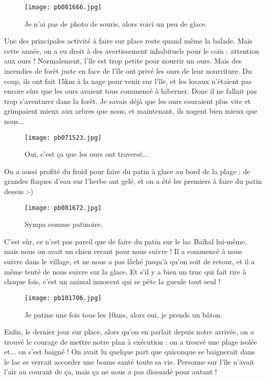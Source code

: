 \documentclass{book}
\begin{document}
\begin{figure}[h]
\centering
\texttt{[image: pb081666.jpg]}
\caption*{ Je n'ai pas de photo de souris, alors voici un peu de glace.}
\end{figure}

Une des principales activité à faire sur place reste quand même la balade. Mais cette année, on a eu droit à des avertissement inhabituels pour le coin : attention aux ours ! Normalement, l'île est trop petite pour nourrir un ours. Mais des incendies de forêt juste en face de l'île ont privé les ours de leur nourriture. Du coup, ils ont fait 15km à la nage pour venir sur l'île, et les locaux n'étaient pas encore sûrs que les ours avaient tous commencé à hiberner. Donc il ne fallait pas trop s'aventurer dans la forêt. Je savais déjà que les ours couraient plus vite et grimpaient mieux aux arbres que nous, et maintenant, ils nagent bien mieux que nous...


\begin{figure}[h]
\centering
\texttt{[image: pb071523.jpg]}
\caption*{ Oui, c'est ça que les ours ont traversé...}
\end{figure}

On a aussi profité du froid pour faire du patin à glace au bord de la plage : de grandes flaques d'eau sur l'herbe ont gelé, et on a été les premiers à faire du patin dessus :-)


\begin{figure}[h]
\centering
\texttt{[image: pb081672.jpg]}
\caption*{ Sympa comme patinoire.}
\end{figure}

C'est sûr, ce n'est pas pareil que de faire du patin sur le lac Baïkal lui-même, mais nous on avait un chien errant pour nous suivre ! Il a commencé à nous suivre dans le village, et ne nous a pas lâché jusqu'à qu'on soit de retour, et il a même tenté de nous suivre sur la glace. Et s'il y a bien un truc qui fait rire à chaque fois, c'est un animal innocent qui se pète la gueule tout seul !


\begin{figure}[h]
\centering
\texttt{[image: pb101706.jpg]}
\caption*{ Je patine une fois tous les 10ans, alors oui, je prends un bâton.}
\end{figure}

Enfin, le dernier jour sur place, alors qu'on en parlait depuis notre arrivée, on a trouvé le courage de mettre notre plan à exécution : on a trouvé une plage isolée et... on s'est baigné ! On avait lu quelque part que quiconque se baignerait dans le lac se verrait accorder une bonne santé toute sa vie. Personne sur l'île n'avait l'air au courant de ça, mais ça ne nous a pas dissuadé pour autant !
\end{document}

